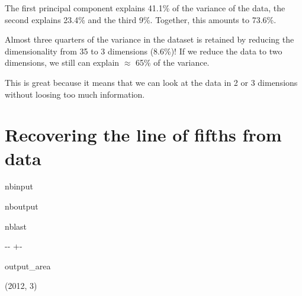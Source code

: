 \documentclass[letterpaper,10pt,english]{sphinxmanual}
\newlength\nbsphinxcodecellspacing
\begin{document}
\sphinxAtStartPar
The first principal component explains 41.1\% of the variance of the data, the second explains 23.4\% and the third 9\%. Together, this amounts to 73.6\%.

\sphinxAtStartPar
Almost three quarters of the variance in the dataset is retained by reducing the dimensionality from 35 to 3 dimensions (8.6\%)! If we reduce the data to two dimensions, we still can explain \(\approx\) 65\% of the variance.

\sphinxAtStartPar
This is great because it means that we can look at the data in 2 or 3 dimensions without loosing too much information.


\section{Recovering the line of fifths from data}
\label{\detokenize{05_data-driven_music_history:Recovering-the-line-of-fifths-from-data}}
\begin{sphinxuseclass}{nbinput}
{
\begin{sphinxVerbatim}[commandchars=\\\{\}]
\llap{\color{nbsphinxin}[18]:\,\hspace{\fboxrule}\hspace{\fboxsep}}  

  
\end{sphinxVerbatim}
}

\end{sphinxuseclass}
\begin{sphinxuseclass}{nboutput}
\begin{sphinxuseclass}{nblast}
{

\kern-\sphinxverbatimsmallskipamount\kern-\baselineskip
\kern+\FrameHeightAdjust\kern-\fboxrule
\vspace{\nbsphinxcodecellspacing}

\begin{sphinxuseclass}{output_area}
\begin{sphinxuseclass}{}


\begin{sphinxVerbatim}[commandchars=\\\{\}]
\llap{\color{nbsphinxout}[18]:\,\hspace{\fboxrule}\hspace{\fboxsep}}(2012, 3)
\end{sphinxVerbatim}



\end{sphinxuseclass}
\end{sphinxuseclass}
}

\end{sphinxuseclass}
\end{sphinxuseclass}
\end{document}
